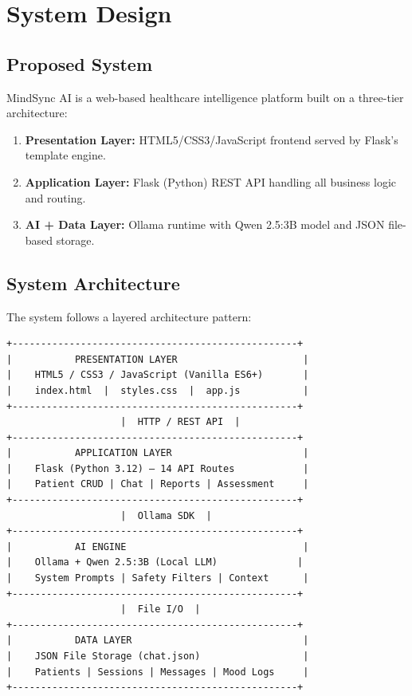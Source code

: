 \documentclass[12pt,a4paper]{report}
\begin{document}
\chapter{System Design}

\section{Proposed System}

MindSync AI is a web-based healthcare intelligence platform built on a three-tier architecture:

\begin{enumerate}
    \item \textbf{Presentation Layer:} HTML5/CSS3/JavaScript frontend served by Flask's template engine.
    \item \textbf{Application Layer:} Flask (Python) REST API handling all business logic and routing.
    \item \textbf{AI + Data Layer:} Ollama runtime with Qwen 2.5:3B model and JSON file-based storage.
\end{enumerate}

\section{System Architecture}

The system follows a layered architecture pattern:

\begin{verbatim}
+--------------------------------------------------+
|           PRESENTATION LAYER                      |
|    HTML5 / CSS3 / JavaScript (Vanilla ES6+)       |
|    index.html  |  styles.css  |  app.js           |
+--------------------------------------------------+
                    |  HTTP / REST API  |
+--------------------------------------------------+
|           APPLICATION LAYER                       |
|    Flask (Python 3.12) — 14 API Routes            |
|    Patient CRUD | Chat | Reports | Assessment     |
+--------------------------------------------------+
                    |  Ollama SDK  |
+--------------------------------------------------+
|           AI ENGINE                               |
|    Ollama + Qwen 2.5:3B (Local LLM)              |
|    System Prompts | Safety Filters | Context      |
+--------------------------------------------------+
                    |  File I/O  |
+--------------------------------------------------+
|           DATA LAYER                              |
|    JSON File Storage (chat.json)                  |
|    Patients | Sessions | Messages | Mood Logs     |
+--------------------------------------------------+
\end{verbatim}
\end{document}

